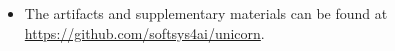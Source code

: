 \begin{itemize}
    \item The artifacts and supplementary materials can be found at \href{github}{\color{blue!80} https://github.com/softsys4ai/unicorn}.
\end{itemize}   

